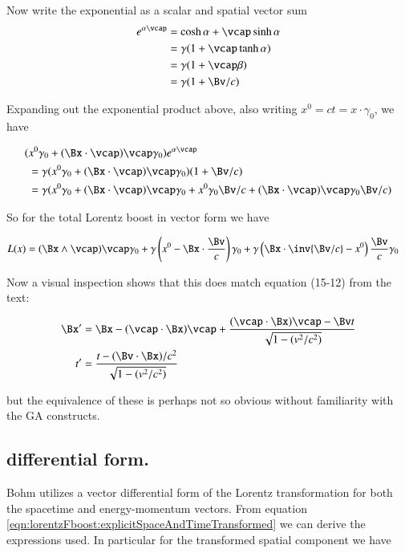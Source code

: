 Now write the exponential as a scalar and spatial vector sum
\begin{align*}
e^{\alpha \vcap}
&= 
\cosh\alpha 
+\vcap \sinh\alpha 
\\
&= 
\gamma (1 +\vcap \tanh\alpha )
\\
&= 
\gamma (1 +\vcap \beta)
\\
&= 
\gamma (1 + \Bv/c )
\\
\end{align*}

Expanding out the exponential product above, also writing $x^0 = ct = x \cdot \gamma_0$, we have

\begin{align*}
( &x^0 \gamma_0 + (\Bx \cdot \vcap) \vcap \gamma_0 ) e^{\alpha \vcap} \\
&=
\gamma ( x^0 \gamma_0 + (\Bx \cdot \vcap) \vcap \gamma_0 ) ( 1 + \Bv/c ) \\
&=
\gamma ( 
x^0 \gamma_0 
+ (\Bx \cdot \vcap) \vcap \gamma_0 
+x^0 \gamma_0 \Bv/c  
+ (\Bx \cdot \vcap) \vcap \gamma_0 \Bv/c
) \\
\end{align*}

So for the total Lorentz boost in vector form we have

\begin{align}\label{eqn:lorentzFboost:fourVectorExpanded}
L(x)
&=
(\Bx \wedge \vcap) \vcap \gamma_0 +
\gamma \left(x^0 - \Bx \cdot \frac{\Bv}{c} \right) \gamma_0
+ \gamma \left( \Bx \cdot \inv{\Bv/c} - x^0 \right) \frac{\Bv}{c} \gamma_0
\end{align}

Now a visual inspection shows that this does match
equation (15-12) from the text:

\begin{align}\label{eqn:lorentzFboost:explicitSpaceAndTimeTransformed}
\Bx' 
&= \Bx - (\vcap \cdot \Bx) \vcap + \frac{ (\vcap \cdot \Bx )\vcap - \Bv t }{ \sqrt{1 - (v^2/c^2)} } \\
t' 
&= \frac{ t - (\Bv \cdot \Bx )/c^2 }{ \sqrt{1 - (v^2/c^2)} } 
\end{align}

but the equivalence of these is perhaps not so obvious without familiarity
with the GA constructs.

\subsection{differential form. }

Bohm utilizes a vector differential form of the Lorentz transformation
for both the spacetime and energy-momentum vectors.  From equation
\ref{eqn:lorentzFboost:explicitSpaceAndTimeTransformed}
we can derive the expressions used.  In particular for the transformed
spatial component we have

